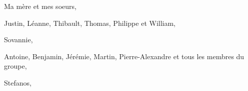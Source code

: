 \begin{comment}
\end{comment}

Ma mère et mes soeurs,

Justin, Léanne, Thibault, Thomas, Philippe et William,

Sovannie,

Antoine, Benjamin, Jérémie, Martin, Pierre-Alexandre et tous les membres du groupe,

Stefanos,

